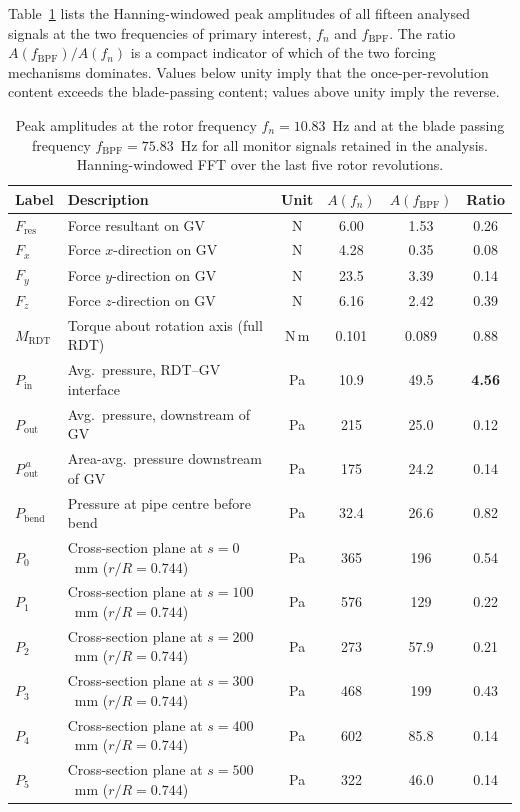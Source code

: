 Table~\ref{tab:peak_amplitudes} lists the Hanning-windowed peak
amplitudes of all fifteen analysed signals at the two frequencies of
primary interest, $f_n$ and $f_{\mathrm{BPF}}$. The ratio
$A(f_{\mathrm{BPF}})/A(f_n)$ is a compact indicator of which of the
two forcing mechanisms dominates. Values below unity imply that the
once-per-revolution content exceeds the blade-passing content;
values above unity imply the reverse.
 
\begin{table}[H]
\centering
\small
\caption{Peak amplitudes at the rotor frequency $f_n = 10.83$~Hz
and at the blade passing frequency $f_{\mathrm{BPF}} = 75.83$~Hz for
all monitor signals retained in the analysis. Hanning-windowed FFT
over the last five rotor revolutions.}
\label{tab:peak_amplitudes}
\begin{tabular}{llcccc}
\hline
Label & Description & Unit & $A(f_n)$ & $A(f_{\mathrm{BPF}})$ & Ratio \\ \hline
$F_{\mathrm{res}}$        & Force resultant on GV    & N    & 6.00  & 1.53  & 0.26 \\
$F_x$                      & Force $x$-direction on GV& N    & 4.28  & 0.35  & 0.08 \\
$F_y$                      & Force $y$-direction on GV& N    & 23.5  & 3.39  & 0.14 \\
$F_z$                      & Force $z$-direction on GV& N    & 6.16  & 2.42  & 0.39 \\
$M_{\mathrm{RDT}}$         & Torque about rotation axis (full RDT) & N\,m & 0.101 & 0.089 & 0.88 \\ \hline
$P_{\mathrm{in}}$          & Avg.\ pressure, RDT--GV interface   & Pa & 10.9 & 49.5 & \textbf{4.56} \\
$P_{\mathrm{out}}$         & Avg.\ pressure, downstream of GV    & Pa & 215  & 25.0 & 0.12 \\
$P_{\mathrm{out}}^{\,a}$   & Area-avg.\ pressure downstream of GV & Pa & 175 & 24.2 & 0.14 \\ \hline
$P_{\mathrm{bend}}$        & Pressure at pipe centre before bend & Pa & 32.4 & 26.6 & 0.82 \\ \hline
$P_0$ & Cross-section plane at $s = 0$~mm    ($r/R = 0.744$) & Pa & 365 & 196  & 0.54 \\
$P_1$ & Cross-section plane at $s = 100$~mm  ($r/R = 0.744$) & Pa & 576 & 129  & 0.22 \\
$P_2$ & Cross-section plane at $s = 200$~mm  ($r/R = 0.744$) & Pa & 273 & 57.9 & 0.21 \\
$P_3$ & Cross-section plane at $s = 300$~mm  ($r/R = 0.744$) & Pa & 468 & 199  & 0.43 \\
$P_4$ & Cross-section plane at $s = 400$~mm  ($r/R = 0.744$) & Pa & 602 & 85.8 & 0.14 \\
$P_5$ & Cross-section plane at $s = 500$~mm  ($r/R = 0.744$) & Pa & 322 & 46.0 & 0.14 \\ \hline
\end{tabular}
\end{table}
 
